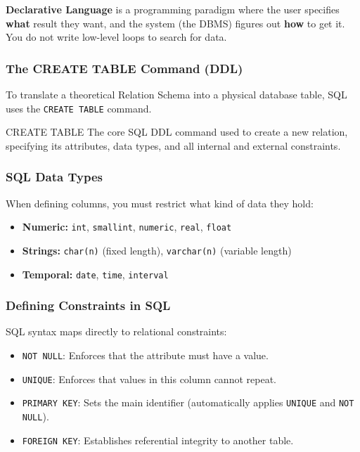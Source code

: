 \textbf{Declarative Language} is a programming paradigm where the user specifies \textbf{what} result they want, and the system (the DBMS) figures out \textbf{how} to get it. You do not write low-level loops to search for data.


\subsubsection{The CREATE TABLE Command (DDL)}
To translate a theoretical Relation Schema into a physical database table, SQL uses the \texttt{CREATE TABLE} command.

\begin{defbox}{CREATE TABLE}
The core SQL DDL command used to create a new relation, specifying its attributes, data types, and all internal and external constraints.
\end{defbox}

\subsubsection{SQL Data Types}
When defining columns, you must restrict what kind of data they hold:
\begin{itemize}
    \item \textbf{Numeric:} \texttt{int}, \texttt{smallint}, \texttt{numeric}, \texttt{real}, \texttt{float}
    \item \textbf{Strings:} \texttt{char(n)} (fixed length), \texttt{varchar(n)} (variable length)
    \item \textbf{Temporal:} \texttt{date}, \texttt{time}, \texttt{interval}
\end{itemize}

\subsubsection{Defining Constraints in SQL}
SQL syntax maps directly to relational constraints:
\begin{itemize}
    \item \texttt{NOT NULL}: Enforces that the attribute must have a value.
    \item \texttt{UNIQUE}: Enforces that values in this column cannot repeat.
    \item \texttt{PRIMARY KEY}: Sets the main identifier (automatically applies \texttt{UNIQUE} and \texttt{NOT NULL}).
    \item \texttt{FOREIGN KEY}: Establishes referential integrity to another table.
\end{itemize}


